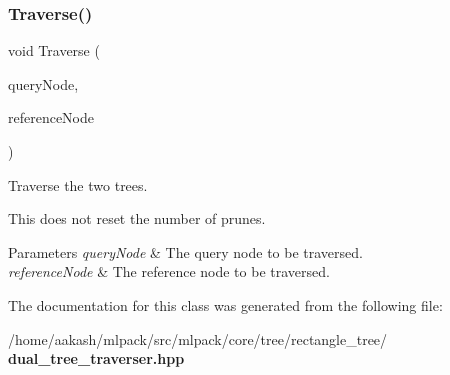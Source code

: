 \mbox{\label{classmlpack_1_1tree_1_1RectangleTree_1_1DualTreeTraverser_a0c33013340f24da2fd803306d367e6a1}} 
\subsubsection{Traverse()}
{\footnotesize\ttfamily void Traverse (\begin{DoxyParamCaption}\item[{Rectangle\+Tree \&}]{query\+Node,  }\item[{Rectangle\+Tree \&}]{reference\+Node }\end{DoxyParamCaption})}



Traverse the two trees. 

This does not reset the number of prunes.


\begin{DoxyParams}{Parameters}
{\em query\+Node} & The query node to be traversed. \\
\hline
{\em reference\+Node} & The reference node to be traversed. \\
\hline
\end{DoxyParams}


The documentation for this class was generated from the following file\+:\begin{DoxyCompactItemize}
\item 
/home/aakash/mlpack/src/mlpack/core/tree/rectangle\+\_\+tree/\textbf{ dual\+\_\+tree\+\_\+traverser.\+hpp}\end{DoxyCompactItemize}
